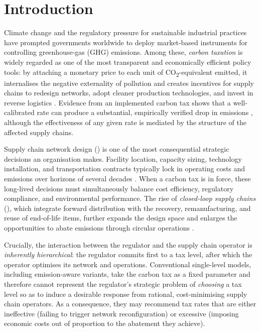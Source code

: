 
\section{Introduction}
\label{sec:introduction}

Climate change and the regulatory pressure for sustainable industrial
practices have prompted governments worldwide to deploy market-based
instruments for controlling greenhouse-gas (GHG) emissions. Among
these, \emph{carbon taxation} is widely regarded as one of the most
transparent and economically efficient policy tools: by attaching a
monetary price to each unit of CO\textsubscript{2}-equivalent
emitted, it internalises the negative externality of pollution and
creates incentives for supply chains to redesign networks, adopt
cleaner production technologies, and invest in reverse logistics
\citep{nordhaus2007, pigou1920}. Evidence from an implemented carbon
tax shows that a well-calibrated rate can produce a substantial,
empirically verified drop in emissions \citep{andersson2019}, although
the effectiveness of any given rate is mediated by the structure of
the affected supply chains.

Supply chain network design (\SCND) is one of the most consequential
strategic decisions an organisation makes. Facility location, capacity
sizing, technology installation, and transportation contracts
typically lock in operating costs and emissions over horizons of
several decades \citep{melo2009}. When a carbon tax is in force,
these long-lived decisions must simultaneously balance cost
efficiency, regulatory compliance, and environmental performance.
The rise of \emph{closed-loop supply chains} (\CLSC), which integrate
forward distribution with the recovery, remanufacturing, and reuse of
end-of-life items, further expands the design space and enlarges the
opportunities to abate emissions through circular operations
\citep{fleischmann2001, govindan2015}.

Crucially, the interaction between the regulator and the supply chain
operator is \emph{inherently hierarchical}: the regulator commits
first to a tax level, after which the operator optimises its network
and operations. Conventional single-level \SCND models, including
emission-aware variants, take the carbon tax as a fixed parameter and
therefore cannot represent the regulator's strategic problem of
\emph{choosing} a tax level so as to induce a desirable response
from rational, cost-minimising supply chain operators. As a
consequence, they may
recommend tax rates that are either ineffective (failing to trigger
network reconfiguration) or excessive (imposing economic costs out
of proportion to the abatement they achieve).

